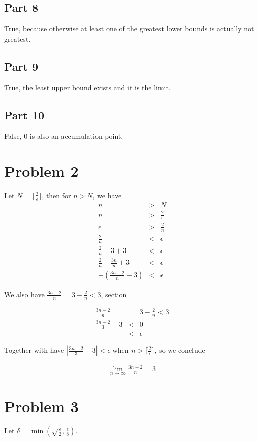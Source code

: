 \documentclass{article}
\begin{document}
\subsection*{Part 8}
True, because otherwise at least one of the greatest lower bounds is actually not greatest.
\subsection*{Part 9}
True, the least upper bound exists and it is the limit.
\subsection*{Part 10}
False, 0 is also an accumulation point.

\section*{Problem 2}
Let $ N = \lceil \frac{2}{\epsilon} \rceil $, then for $ n > N $, we have
\begin{eqnarray*}
              n & > & N \\
              n & > & \frac{2}{\epsilon} \\
       \epsilon & > & \frac{2}{n} \\
    \frac{2}{n} & < & \epsilon \\
    \frac{2}{n} - 3 + 3 & < & \epsilon \\
    \frac{2}{n} - \frac{3n}{n} + 3 & < & \epsilon \\
    -(\frac{3n - 2}{n} - 3) & < & \epsilon
\end{eqnarray*}

We also have $ \frac{3n - 2}{n} = 3 - \frac{2}{n} < 3 $, section

\begin{eqnarray*}
      \frac{3n - 2}{n} &=& 3 - \frac{2}{n} < 3 \\
  \frac{3n - 2}{3} - 3 &<& 0 \\
                       &<& \epsilon
\end{eqnarray*}

Together with have $ |\frac{3n - 2}{3} - 3| < \epsilon $ when $ n > \lceil \frac{2}{\epsilon} \rceil $, so we conclude

\begin{eqnarray}
    \lim_{n \to \infty} \frac{3n - 2}{n} = 3
\end{eqnarray}

\section*{Problem 3}
Let $ \delta = \min (\sqrt{\frac{\epsilon}{2}}, \frac{\epsilon}{8}) $.
\end{document}

